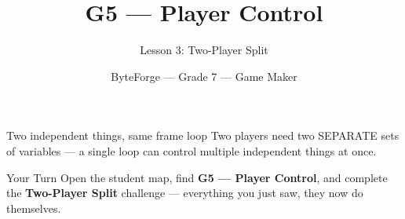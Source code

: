\documentclass[aspectratio=169]{beamer}
\title{G5 — Player Control}
\subtitle{Lesson 3: Two-Player Split}
\author{ByteForge --- Grade 7 --- Game Maker}
\date{}
\begin{document}
\begin{frame}
    \titlepage
\end{frame}

\begin{frame}{Two independent things, same frame loop}
    \Large
    Two players need two SEPARATE sets of variables — a single loop can control multiple independent things at once.
\end{frame}

\begin{frame}{Your Turn}
    \Large
    Open the student map, find \textbf{G5 — Player Control}, and complete
    the \textbf{Two-Player Split} challenge --- everything you just saw, they now do themselves.
\end{frame}
\end{document}
